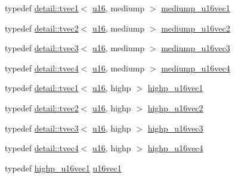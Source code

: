 \begin{DoxyCompactItemize}
\item 
typedef \hyperlink{structglm_1_1detail_1_1tvec1}{detail\+::tvec1}$<$ \hyperlink{group__gtc__type__precision_gae7a1571503f83d2264ddfa705a6b082a}{u16}, mediump $>$ \hyperlink{group__gtc__type__precision_gacb35d25d662b2a6396d094197ca834f0}{mediump\+\_\+u16vec1}
\item 
typedef \hyperlink{structglm_1_1detail_1_1tvec2}{detail\+::tvec2}$<$ \hyperlink{group__gtc__type__precision_gae7a1571503f83d2264ddfa705a6b082a}{u16}, mediump $>$ \hyperlink{group__gtc__type__precision_ga93fe5ddc21391f0334eb3a60b76c390b}{mediump\+\_\+u16vec2}
\item 
typedef \hyperlink{structglm_1_1detail_1_1tvec3}{detail\+::tvec3}$<$ \hyperlink{group__gtc__type__precision_gae7a1571503f83d2264ddfa705a6b082a}{u16}, mediump $>$ \hyperlink{group__gtc__type__precision_ga82dbfd263ced8d03577008a3ef096598}{mediump\+\_\+u16vec3}
\item 
typedef \hyperlink{structglm_1_1detail_1_1tvec4}{detail\+::tvec4}$<$ \hyperlink{group__gtc__type__precision_gae7a1571503f83d2264ddfa705a6b082a}{u16}, mediump $>$ \hyperlink{group__gtc__type__precision_gaad8b540f4231f69823c39fe9dfcb945a}{mediump\+\_\+u16vec4}
\item 
typedef \hyperlink{structglm_1_1detail_1_1tvec1}{detail\+::tvec1}$<$ \hyperlink{group__gtc__type__precision_gae7a1571503f83d2264ddfa705a6b082a}{u16}, highp $>$ \hyperlink{group__gtc__type__precision_gac4a83dec879b77ab0055c8da232da066}{highp\+\_\+u16vec1}
\item 
typedef \hyperlink{structglm_1_1detail_1_1tvec2}{detail\+::tvec2}$<$ \hyperlink{group__gtc__type__precision_gae7a1571503f83d2264ddfa705a6b082a}{u16}, highp $>$ \hyperlink{group__gtc__type__precision_gafad4245d389a4990eb505cd74a2d0a6f}{highp\+\_\+u16vec2}
\item 
typedef \hyperlink{structglm_1_1detail_1_1tvec3}{detail\+::tvec3}$<$ \hyperlink{group__gtc__type__precision_gae7a1571503f83d2264ddfa705a6b082a}{u16}, highp $>$ \hyperlink{group__gtc__type__precision_gad98b30ad9bbfb79233340be3ba53ceb6}{highp\+\_\+u16vec3}
\item 
typedef \hyperlink{structglm_1_1detail_1_1tvec4}{detail\+::tvec4}$<$ \hyperlink{group__gtc__type__precision_gae7a1571503f83d2264ddfa705a6b082a}{u16}, highp $>$ \hyperlink{group__gtc__type__precision_ga89074b108ec0643cffdfd008bedd3ffb}{highp\+\_\+u16vec4}
\item 
typedef \hyperlink{group__gtc__type__precision_gac4a83dec879b77ab0055c8da232da066}{highp\+\_\+u16vec1} \hyperlink{group__gtc__type__precision_ga95324b9d781c51a6d31b05fcc63c5cbe}{u16vec1}

\end{DoxyCompactItemize}
